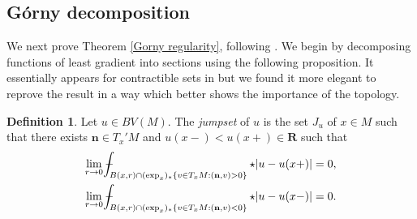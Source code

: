 \documentclass[reqno,10pt]{amsart}
\newcommand{\RR}{\mathbf{R}}
\newcommand{\normal}{\mathbf n}
\newcommand{\dfn}[1]{\emph{#1}\index{#1}}
\theoremstyle{definition}
\newtheorem{definition}[theorem]{Definition}
\numberwithin{equation}{section}
\def\Xint#1{\mathchoice
{\XXint\displaystyle\textstyle{#1}}%
{\XXint\textstyle\scriptstyle{#1}}%
{\XXint\scriptstyle\scriptscriptstyle{#1}}%
{\XXint\scriptscriptstyle\scriptscriptstyle{#1}}%
\!\int}
\def\XXint#1#2#3{{\setbox0=\hbox{$#1{#2#3}{\int}$ }
\vcenter{\hbox{$#2#3$ }}\kern-.6\wd0}}
\def\dashint{\Xint-}
\begin{document}
\subsection{G\'orny decomposition}
We next prove Theorem \ref{Gorny regularity}, following \cite[\S3]{górny2017planar}.
We begin by decomposing functions of least gradient into sections using the following proposition.
It essentially appears for contractible sets in \cite[pg10-11]{górny2017planar} but we found it more elegant to reprove the result in a way which better shows the importance of the topology.

\begin{definition}
Let $u \in BV(M)$. The \dfn{jumpset} of $u$ is the set $J_u$ of $x \in M$ such that there exists $\normal \in T_x'M$ and $u(x-) < u(x+) \in \RR$ such that 
\begin{align*}
\lim_{r \to 0} \dashint_{B(x, r) \cap (\exp_x)_* \{v \in T_xM: (\normal, v) > 0\}} \star |u - u(x+)|  & = 0, \\
\lim_{r \to 0} \dashint_{B(x, r) \cap (\exp_x)_* \{v \in T_xM: (\normal, v) < 0\}} \star |u - u(x-)|  & = 0.
\end{align*}
\end{definition}
\end{document}
